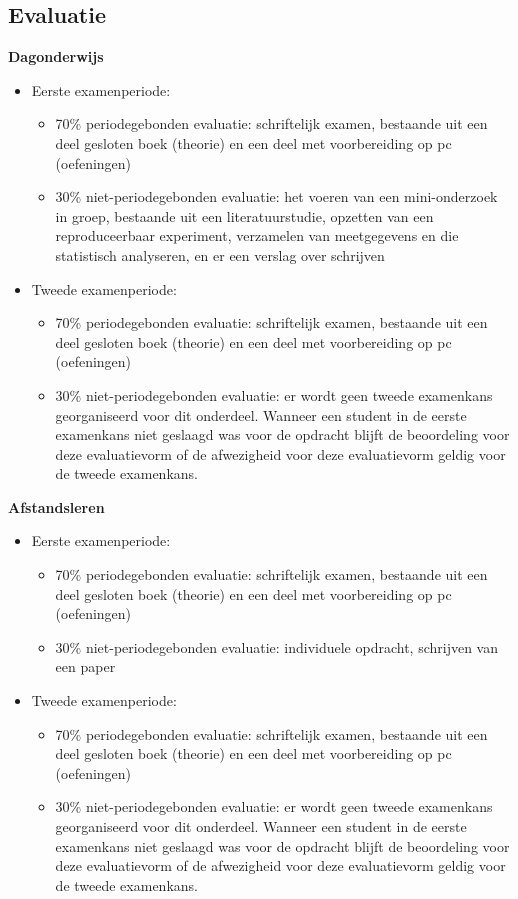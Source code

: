 \subsection{Evaluatie}

\textbf{Dagonderwijs}

\begin{itemize}
  \item Eerste examenperiode:
  \begin{itemize}
    \item 70\% periodegebonden evaluatie: schriftelijk examen, bestaande uit een deel gesloten boek (theorie) en een deel met voorbereiding op pc (oefeningen)
    \item 30\% niet-periodegebonden evaluatie: het voeren van een mini-onderzoek in groep, bestaande uit een literatuurstudie, opzetten van een reproduceerbaar experiment, verzamelen van meetgegevens en die statistisch analyseren, en er een verslag over schrijven
  \end{itemize}
  \item Tweede examenperiode:
  \begin{itemize}
    \item 70\% periodegebonden evaluatie: schriftelijk examen, bestaande uit een deel gesloten boek (theorie) en een deel met voorbereiding op pc (oefeningen)
    \item 30\% niet-periodegebonden evaluatie: er wordt geen tweede examenkans georganiseerd voor dit onderdeel. Wanneer een student in de eerste examenkans niet geslaagd was voor de opdracht blijft de beoordeling voor deze evaluatievorm of de afwezigheid voor deze evaluatievorm geldig voor de tweede examenkans.
  \end{itemize}
\end{itemize}

\textbf{Afstandsleren}

\begin{itemize}
  \item Eerste examenperiode:
  \begin{itemize}
    \item 70\% periodegebonden evaluatie: schriftelijk examen, bestaande uit een deel gesloten boek (theorie) en een deel met voorbereiding op pc (oefeningen)
    \item 30\% niet-periodegebonden evaluatie: individuele opdracht, schrijven van een paper
  \end{itemize}
  \item Tweede examenperiode:
  \begin{itemize}
    \item 70\% periodegebonden evaluatie: schriftelijk examen, bestaande uit een deel gesloten boek (theorie) en een deel met voorbereiding op pc (oefeningen)
    \item 30\% niet-periodegebonden evaluatie: er wordt geen tweede examenkans georganiseerd voor dit onderdeel. Wanneer een student in de eerste examenkans niet geslaagd was voor de opdracht blijft de beoordeling voor deze evaluatievorm of de afwezigheid voor deze evaluatievorm geldig voor de tweede examenkans.
  \end{itemize}
\end{itemize}


